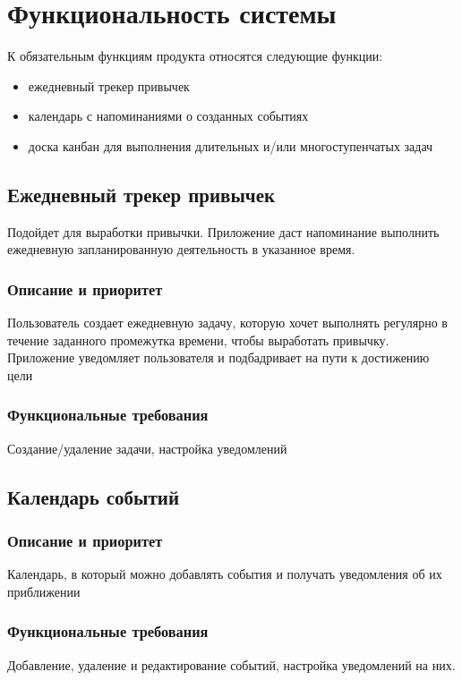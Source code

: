 \chapter{Функциональность системы}
\label{ch:functionality}

К обязательным функциям продукта относятся следующие функции:
\begin{itemize}
    \item ежедневный трекер привычек
    \item календарь с напоминаниями о созданных событиях
    \item доска канбан для выполнения длительных и/или многоступенчатых задач
\end{itemize}

\section{Ежедневный трекер привычек}
Подойдет для выработки привычки. Приложение даст напоминание выполнить ежедневную запланированную деятельность в указанное время.

\subsection{Описание и приоритет}
Пользователь создает ежедневную задачу, которую хочет выполнять регулярно в течение заданного промежутка времени, чтобы выработать привычку. Приложение уведомляет пользователя и подбадривает на пути к достижению цели

\subsection{Функциональные требования}
Создание/удаление задачи, настройка уведомлений

\section{Календарь событий}

\subsection{Описание и приоритет}
Календарь, в который можно добавлять события и получать уведомления об их приближении

\subsection{Функциональные требования}
Добавление, удаление и редактирование событий, настройка уведомлений на них.

